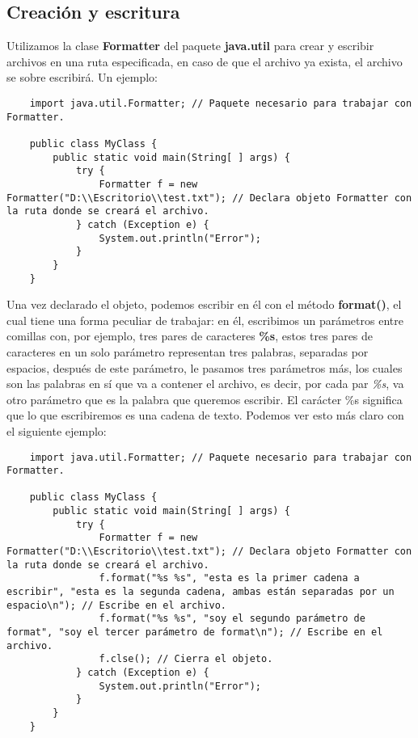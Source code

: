 \subsection{Creación y escritura}

Utilizamos la clase \textbf{Formatter} del paquete \textbf{java.util} para crear y escribir archivos en una ruta especificada, en caso de que el archivo ya exista, el archivo se sobre escribirá. Un ejemplo:
\begin{lstlisting}
    import java.util.Formatter; // Paquete necesario para trabajar con Formatter.

    public class MyClass {
        public static void main(String[ ] args) {
            try {
                Formatter f = new Formatter("D:\\Escritorio\\test.txt"); // Declara objeto Formatter con la ruta donde se creará el archivo.
            } catch (Exception e) {
                System.out.println("Error");
            }
        }
    }
\end{lstlisting}

Una vez declarado el objeto, podemos escribir en él con el método \textbf{format()}, el cual tiene una forma peculiar de trabajar: en él, escribimos un parámetros entre comillas con, por ejemplo, tres pares de caracteres \textbf{\%s}, estos tres pares de caracteres en un solo parámetro representan tres palabras, separadas por espacios, después de este parámetro, le pasamos tres parámetros más, los cuales son las palabras en sí que va a contener el archivo, es decir, por cada par \textit{\%s}, va otro parámetro que es la palabra que queremos escribir. El carácter \%s significa que lo que escribiremos es una cadena de texto. Podemos ver esto más claro con el siguiente ejemplo:
\begin{lstlisting}
    import java.util.Formatter; // Paquete necesario para trabajar con Formatter.

    public class MyClass {
        public static void main(String[ ] args) {
            try {
                Formatter f = new Formatter("D:\\Escritorio\\test.txt"); // Declara objeto Formatter con la ruta donde se creará el archivo.
                f.format("%s %s", "esta es la primer cadena a escribir", "esta es la segunda cadena, ambas están separadas por un espacio\n"); // Escribe en el archivo.
                f.format("%s %s", "soy el segundo parámetro de format", "soy el tercer parámetro de format\n"); // Escribe en el archivo.
                f.clse(); // Cierra el objeto.
            } catch (Exception e) {
                System.out.println("Error");
            }
        }
    }
\end{lstlisting}
